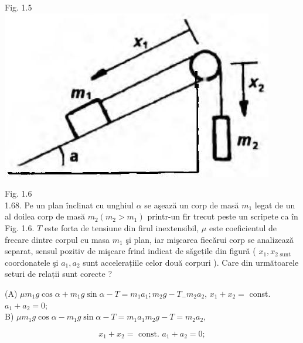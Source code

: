 \documentclass[10pt]{article}
\begin{document}
Fig. 1.5\\
\includegraphics[max width=\textwidth, center]{2025_07_01_5b3ff9fa0d508c8e9f17g-017}

Fig. 1.6\\
1.68. Pe un plan înclinat cu unghiul $\alpha$ se aşează un corp de masă $m_{1}$ legat de un al doilea corp de masă $m_{2}\left(m_{2}>m_{1}\right)$ printr-un fir trecut peste un scripete ca în Fig. 1.6. $T$ este forta de tensiune din firul inextensibil, $\mu$ este coeficientul de frecare dintre corpul cu masa $m_{1}$ şi plan, iar mişcarea fiecărui corp se analizează separat, sensul pozitiv de mişcare frind indicat de săgețile din figură ( $x_{1}, x_{2 \text { sunt }}$ coordonatele şi $a_{1}, a_{2}$ sunt accelerațiile celor două corpuri ). Care din următoarele seturi de relații sunt corecte ?

\begin{displayquote}
(A) $\mu m_{1} g \cos \alpha+m_{1} g \sin \alpha-T=m_{1} a_{1} ; m_{2} g-T_{-} m_{2} a_{2}$, $x_{1}+x_{2}=$ const. $a_{1}+a_{2}=0$;\\
B) $\mu m_{1} g \cos \alpha-m_{1} g \sin \alpha-T=m_{1} a_{1} m_{2} g-T=m_{2} a_{2}$,
\end{displayquote}

$$
x_{1}+x_{2}=\text { const. } a_{1}+a_{2}=0 ;
$$
\end{document}
